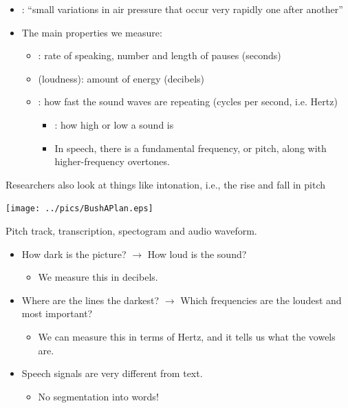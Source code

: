 \documentclass[a4paper,landscape,headrule,footrule,xetex]{foils}
\begin{document}
\begin{itemize}
\item {}: ``small variations in air pressure that occur very rapidly one after another''
\item The main properties we measure:
  \begin{itemize}
  \item {}:  rate of speaking, number and length of pauses (seconds)
  \item {} (loudness): amount of energy (decibels)
  \item {}: how fast the sound waves are repeating (cycles per second, i.e. Hertz)
    \begin{itemize}
    \item {}:  how high or low a sound is
    \item In speech, there is a fundamental frequency, or pitch, along with higher-frequency overtones.
    \end{itemize}
  \end{itemize}
\end{itemize}

Researchers also look at things like intonation, i.e., the rise and fall in pitch



\noindent\texttt{[image: ../pics/BushAPlan.eps]}


Pitch track, transcription, spectogram and audio waveform.





\begin{itemize}
\item  How dark is the picture? $\rightarrow$ How loud is the sound?
  \begin{itemize}
  \item We measure this in decibels.
  \end{itemize}
\item Where are the lines the darkest? $\rightarrow$  Which frequencies are the loudest and most important?
  \begin{itemize}
  \item We can measure this in terms of Hertz, and it tells us what the vowels are.
  \end{itemize}

\item Speech signals are very different from text.
  \begin{itemize}
  \item No segmentation into words!
  \end{itemize}
\end{itemize}
\end{document}
